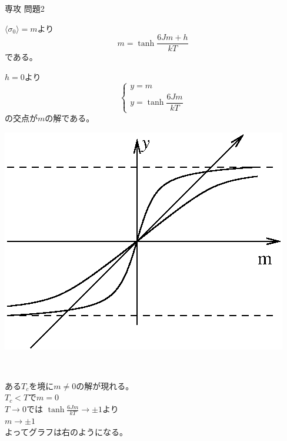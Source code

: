 \documentclass[fleqn]{jbook}
\begin{document}
\begin{answer}{専攻 問題2}{}
\begin{subanswers}
\begin{subsubanswers}
  \SubSubAnswer
    $\langle \sigma_0 \rangle = m$より
    \[
      m = \tanh \frac{ 6Jm + h }{kT}
    \]
    である。
    
  \SubSubAnswer
    \parbox[t]{60mm}{
    $h=0$より
    \[
    \begin{cases}
	y = m\\
	y = \tanh \dfrac{6Jm}{kT}
	\end{cases}
	\]
    の交点が$m$の解である。\\
}
   \parbox[t]{90mm}{
   \begin{center}
    \includegraphics[clip]{1998phy2-1.eps}
   \end{center}
   } 
   \\
   \parbox[t]{60mm}{
   ある$T_c$を境に$m \neq 0$の解が現れる。\\
    $T_c < T$で$m=0$\\
    $T\rightarrow 0$では $\tanh \frac{6Jm}{kT} \rightarrow \pm 1$より\\
    $m \rightarrow \pm 1$\\
    よってグラフは右のようになる。
    }
    \parbox[t]{90mm}{
    
}
\end{subsubanswers}
\end{subanswers}
\end{answer}
\end{document}
